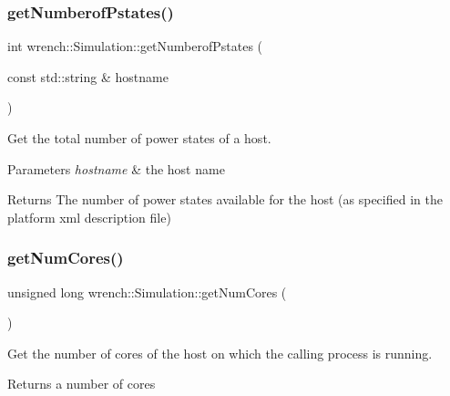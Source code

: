 \subsubsection{\texorpdfstring{get\+Numberof\+Pstates()}{getNumberofPstates()}}
{\footnotesize\ttfamily int wrench\+::\+Simulation\+::get\+Numberof\+Pstates (\begin{DoxyParamCaption}\item[{const std\+::string \&}]{hostname }\end{DoxyParamCaption})\hspace{0.3cm}{\ttfamily [static]}}



Get the total number of power states of a host. 


\begin{DoxyParams}{Parameters}
{\em hostname} & the host name \\
\hline
\end{DoxyParams}
\begin{DoxyReturn}{Returns}
The number of power states available for the host (as specified in the platform xml description file) 
\end{DoxyReturn}
\mbox{\label{classwrench_1_1_simulation_aa5d966b1ac072a8a71db4bd527a62224}} 
\subsubsection{\texorpdfstring{get\+Num\+Cores()}{getNumCores()}}
{\footnotesize\ttfamily unsigned long wrench\+::\+Simulation\+::get\+Num\+Cores (\begin{DoxyParamCaption}{ }\end{DoxyParamCaption})\hspace{0.3cm}{\ttfamily [static]}}



Get the number of cores of the host on which the calling process is running. 

\begin{DoxyReturn}{Returns}
a number of cores 
\end{DoxyReturn}
\mbox{\label{classwrench_1_1_simulation_aff0338aa6831c6ac252cf0673fe68f44}} 
